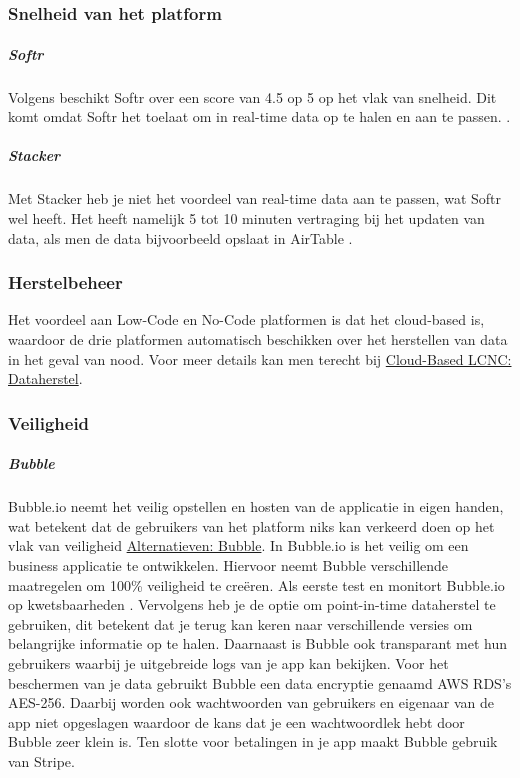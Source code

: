 \chapter{}%
\label{ch:vergelijkende-analyse}
\subsection{Snelheid van het platform}%
\label{subsec:snelheid-van-het-platform}
\paragraph{Softr}
Volgens \textcite{Code2023} 
beschikt Softr over een score van 4.5 op 5 op het vlak van snelheid. 
Dit komt omdat Softr het toelaat om in real-time data op te halen en aan te passen. \autocite{Youssef2023}.
\paragraph{Stacker}
Met Stacker heb je niet het voordeel van real-time data aan te passen, wat Softr wel heeft.
 Het heeft namelijk 5 tot 10 minuten vertraging bij het updaten van data, als men de data bijvoorbeeld opslaat in AirTable \autocite{Youssef2023}.

\subsection{Herstelbeheer}%
\label{subsec:herstelbeheer}
Het voordeel aan Low-Code en No-Code platformen is dat het cloud-based is, waardoor de drie platformen automatisch beschikken over het herstellen van data in het geval van nood. 
Voor meer details kan men terecht bij \hyperref[subsec:cloud-based-lcnc]{Cloud-Based LCNC: Dataherstel}.
\subsection{Veiligheid}%
\label{subsec:veiligheid}
\paragraph{Bubble}
Bubble.io neemt het veilig opstellen en hosten van de applicatie in eigen handen, wat betekent dat de gebruikers van het platform niks kan verkeerd doen op het vlak van veiligheid \hyperref[subsec:bubble]{Alternatieven: Bubble}.
In Bubble.io is het veilig om een business applicatie te ontwikkelen. Hiervoor neemt Bubble verschillende maatregelen om 100\% veiligheid te creëren. 
Als eerste test en monitort Bubble.io op kwetsbaarheden \autocite{Agency2023}. Vervolgens heb je de optie om point-in-time dataherstel te gebruiken, dit betekent dat je terug kan keren naar verschillende versies om belangrijke informatie op te halen. Daarnaast is Bubble ook transparant met hun gebruikers waarbij je uitgebreide logs van je app kan bekijken. Voor het beschermen van je data gebruikt Bubble een data encryptie genaamd AWS RDS’s AES-256. Daarbij worden ook wachtwoorden van gebruikers en eigenaar van de app niet opgeslagen waardoor de kans dat je een wachtwoordlek hebt door Bubble zeer klein is. Ten slotte voor betalingen in je app maakt Bubble gebruik van Stripe.
